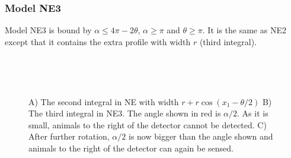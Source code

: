 

\subsubsection{Model NE3} \label{NE3}

Model NE3 is bound by $\alpha \le 4\pi - 2\theta$, $\alpha \ge \pi$ and $\theta \ge \pi$. It is the same as NE2 except that it contains the extra profile with width $r$ (third integral).





\begin{figure}[t]
        \centering
        \begin{subfigure}[t]{0.3\textwidth}
                \centering
                \caption{}
                \label{f:NELimit}
        \end{subfigure}
        ~ 
        \begin{subfigure}[t]{0.3\textwidth}
                \centering
                \caption{}
                \label{f:NE3third}
        \end{subfigure}
        ~ 
        \begin{subfigure}[t]{0.3\textwidth}
                \centering
                \caption{}
                \label{f:NE3fourth}
        \end{subfigure}
\caption{A) The second integral in NE with width $r + r\cos(x_1 - \theta/2)$ B) The third integral in NE3. The angle shown in red is $\alpha/2$. As it is small, animals to the right of the detector cannot be detected. C) After further rotation, $\alpha/2$ is now bigger than the angle shown and animals to the right of the detector can again be sensed.   }
\label{f:NE}
\end{figure}


